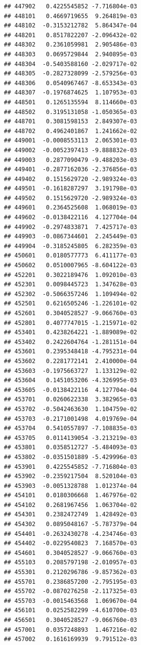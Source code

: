 \begin{frame}[fragile]
\begin{verbatim}
## 447902   0.4225545852 -7.716804e-03
## 448101   0.4669719655  9.264819e-03
## 448102  -0.3153212782  5.864347e-04
## 448201   0.8517822207 -2.096432e-02
## 448302   0.2361059981  2.905486e-03
## 448303   0.0695729844  2.940895e-03
## 448304  -0.5403588160 -2.029717e-02
## 448305  -0.2827328099 -2.579256e-03
## 448306   0.0540967467 -8.653343e-03
## 448307  -0.1976874625  1.107953e-03
## 448501   0.1265135594  8.114660e-03
## 448502   0.3195131058 -1.050365e-03
## 448701   0.3081598153  2.849307e-03
## 448702   0.4962401867  1.241662e-02
## 449001  -0.0008553113  2.065301e-03
## 449002  -0.0052397413 -9.888832e-03
## 449003   0.2877090479 -9.488203e-03
## 449401  -0.2877162036 -2.376856e-03
## 449402   0.1515629720 -2.989324e-03
## 449501  -0.1618287297  3.191798e-03
## 449502   0.1515629720 -2.989324e-03
## 449601   0.2364525608  1.068019e-03
## 449602  -0.0138422116  4.127704e-04
## 449902  -0.2974833871  7.425717e-03
## 449903  -0.0867344601  2.245449e-03
## 449904  -0.3185245805  6.282359e-03
## 450601   0.0180577773  6.411177e-03
## 450602   0.0510007965 -8.604122e-03
## 452201   0.3022189476  1.092010e-03
## 452301   0.0098445723  1.347628e-03
## 452302  -0.5066357246  1.109494e-02
## 452501   0.6216505246 -1.226101e-02
## 452601   0.3040528527 -9.066760e-03
## 452801   0.4077747015 -1.215971e-02
## 453401   0.4238264221 -1.889089e-02
## 453402   0.2422604764 -1.281151e-04
## 453601   0.2395348418 -4.795231e-04
## 453602   0.2281772141  2.410000e-04
## 453603  -0.1975663727  1.133129e-02
## 453604   0.1451053206 -4.326995e-03
## 453605  -0.0138422116  4.127704e-04
## 453701   0.0260622338  3.382965e-03
## 453702  -0.5042463630  1.104759e-02
## 453703  -0.2171001498  4.019769e-04
## 453704   0.5410557897 -7.108835e-03
## 453705   0.0114139054 -3.213219e-03
## 453801   0.0358512727 -5.484093e-03
## 453802  -0.0351501889 -5.429996e-03
## 453901   0.4225545852 -7.716804e-03
## 453902  -0.2359217504  8.520104e-03
## 453903  -0.0051328788  1.012374e-04
## 454101   0.0180306668  1.467976e-02
## 454102   0.2681967456  1.063704e-02
## 454301   0.2382472749  1.428492e-03
## 454302   0.0895048167 -5.787379e-04
## 454401  -0.2632430278 -4.234746e-03
## 454402  -0.0229540823  7.168570e-03
## 454601   0.3040528527 -9.066760e-03
## 455103   0.2085797198 -2.010957e-03
## 455301   0.2120296786 -9.857362e-03
## 455701   0.2386857200 -2.795195e-03
## 455702  -0.0870276258 -2.117325e-03
## 455703  -0.0015463568  1.069670e-04
## 456101   0.0252582299 -4.610700e-03
## 456501   0.3040528527 -9.066760e-03
## 457001   0.0357248893  1.467216e-02
## 457002   0.1616169939  9.791512e-03

\end{verbatim}
\end{frame}
